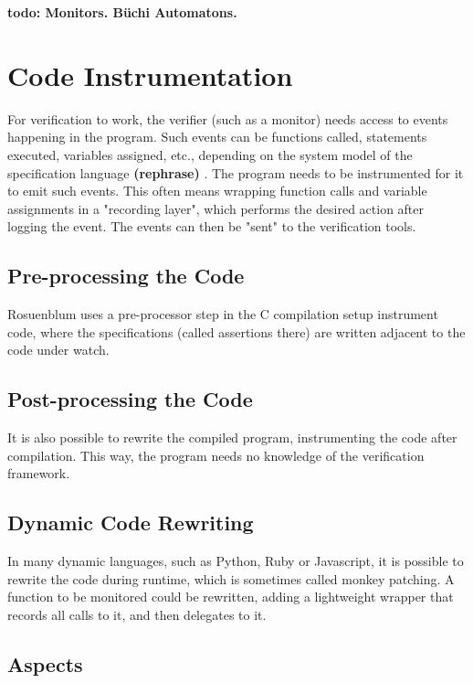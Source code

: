 \documentclass[a4paper,11pt]{kth-mag}
\newcommand{\todo}[1]{\textbf{todo: #1}}
\newcommand{\rephrase}{\textbf{(rephrase)} }
\begin{document}
\todo{Monitors. Büchi Automatons.}


\section{Code Instrumentation} \label{section-instrumentation}

For verification to work, the verifier (such as a monitor) needs access to
events happening in the program. Such events can be functions called,
statements executed, variables assigned, etc., depending on the system model of
the specification language \rephrase. The program needs to be instrumented for
it to emit such events. This often means wrapping function calls and variable
assignments in a "recording layer", which performs the desired action after
logging the event. The events can then be "sent" to the verification tools.


\subsection{Pre-processing the Code}

Rosuenblum \cite{rosenblum95practicalassertions} uses a pre-processor step in
the C compilation setup instrument code, where the specifications (called
assertions there) are written adjacent to the code under watch.


\subsection{Post-processing the Code}

It is also possible to rewrite the compiled program, instrumenting the code
after compilation. This way, the program needs no knowledge of the verification
framework.


\subsection{Dynamic Code Rewriting}

In many dynamic languages, such as Python, Ruby or Javascript, it is possible
to rewrite the code during runtime, which is sometimes called monkey patching.
A function to be monitored could be rewritten, adding a lightweight wrapper
that records all calls to it, and then delegates to it.


\subsection{Aspects}
\end{document}
